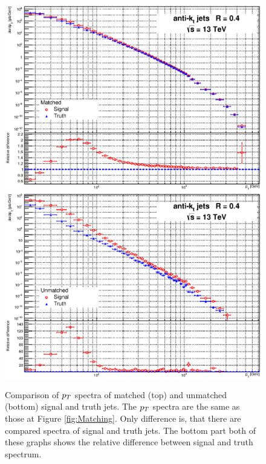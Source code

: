 \begin{appendices}
\begin{figure}[p]
  \centering
  \includegraphics[width=\textwidth]{Chapter3/SignalVSTruthMatched.eps}
  \includegraphics[width=\textwidth]{Chapter3/SignalVSTruthUnmatched.eps}
  \caption{Comparison of $p_{T}$ spectra of matched (top) and unmatched (bottom)
  signal and truth jets. The $p_{T}$ spectra are the same as those at Figure
  \ref{fig:Matching}. Only difference is, that there are compared spectra of
  signal and truth jets.  The bottom part both of these graphs shows the
  relative difference between signal and truth spectrum. }
  \label{fig:MatchedUnmatched}
\end{figure}


\end{appendices}
